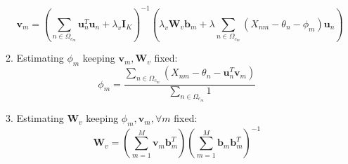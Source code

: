 \documentclass[a4paper,11pt]{article}
\begin{document}
\begin{mlsolution}
\begin{itemize}
\begin{enumerate}
		\[
		\textbf{v}_{m} = \left( \sum_{n\in \Omega_{c_m}} \textbf{u}^{T}_{n}\textbf{u}_{n} + \lambda_{v}\textbf{I}_{K} \right)^{-1}\left( \lambda_{v}\textbf{W}_{v}\textbf{b}_{m} + \lambda \sum_{n\in \Omega_{c_m}} (X_{nm} - \theta_n - \phi_{m})\textbf{u}_{n} \right)  
		\]
		\item Estimating $\phi_m$ keeping $\textbf{v}_{m}, \textbf{W}_{v}$ fixed:
		\[
		\phi_m = \frac{\sum_{n\in \Omega_{c_m}}(X_{nm} - \theta_{n} - \textbf{u}^{T}_{n}\textbf{v}_{m})}{\sum_{n\in \Omega_{c_m}}1}
		\]
		\item  Estimating $\textbf{W}_{v}$ keeping $\phi_{m}, \textbf{v}_{m}, \forall m $ fixed:
		\[
		\textbf{W}_{v} = \left( \sum_{m=1}^{M}\textbf{v}_{m}\textbf{b}^{T}_{m} \right) \left( \sum_{m=1}^{M}\textbf{b}_{m}\textbf{b}^{T}_{m}\right)^{-1}
		\]
	\end{enumerate}
\end{itemize}

\end{mlsolution}
\end{document}
